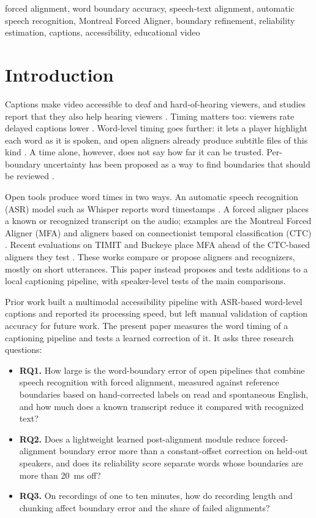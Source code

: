 \documentclass[conference,a4paper]{IEEEtran}
\begin{document}
\begin{IEEEkeywords}
forced alignment, word boundary accuracy, speech-text alignment, automatic speech recognition, Montreal Forced Aligner, boundary refinement, reliability estimation, captions, accessibility, educational video
\end{IEEEkeywords}

\section{Introduction}
Captions make video accessible to deaf and hard-of-hearing viewers, and studies report that they also help hearing viewers \cite{Gernsbacher2015}. Timing matters too: viewers rate delayed captions lower \cite{Thompson2026}. Word-level timing goes further: it lets a player highlight each word as it is spoken, and open aligners already produce subtitle files of this kind \cite{Rastorgueva2023}. A time alone, however, does not say how far it can be trusted. Per-boundary uncertainty has been proposed as a way to find boundaries that should be reviewed \cite{Kelley2026}.

Open tools produce word times in two ways. An automatic speech recognition (ASR) model such as Whisper reports word timestamps \cite{Radford2023}. A forced aligner places a known or recognized transcript on the audio; examples are the Montreal Forced Aligner (MFA) \cite{McAuliffe2017} and aligners based on connectionist temporal classification (CTC) \cite{Pratap2024,Hwang2023}. Recent evaluations on TIMIT and Buckeye place MFA ahead of the CTC-based aligners they test \cite{Rousso2024,McAuliffe2026,Zolkepli2026,Chu2026FABench}. These works compare or propose aligners and recognizers, mostly on short utterances. This paper instead proposes and tests additions to a local captioning pipeline, with speaker-level tests of the main comparisons.

Prior work \cite{Nurym2026} built a multimodal accessibility pipeline with ASR-based word-level captions and reported its processing speed, but left manual validation of caption accuracy for future work. The present paper measures the word timing of a captioning pipeline and tests a learned correction of it. It asks three research questions:
\begin{itemize}
\item \textbf{RQ1.} How large is the word-boundary error of open pipelines that combine speech recognition with forced alignment, measured against reference boundaries based on hand-corrected labels on read and spontaneous English, and how much does a known transcript reduce it compared with recognized text?
\item \textbf{RQ2.} Does a lightweight learned post-alignment module reduce forced-alignment boundary error more than a constant-offset correction on held-out speakers, and does its reliability score separate words whose boundaries are more than 20~ms off?
\item \textbf{RQ3.} On recordings of one to ten minutes, how do recording length and chunking affect boundary error and the share of failed alignments?
\end{itemize}
\end{document}
